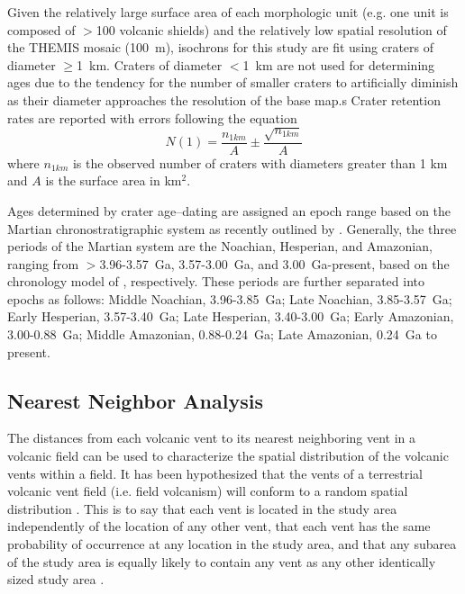 Given the relatively large surface area of each morphologic unit (e.g. one unit is composed of $>$100 volcanic shields) and the relatively low spatial resolution of the THEMIS mosaic (100~m), isochrons for this study are fit using craters of diameter $\ge$1~km. Craters of diameter $<$1~km are not used for determining ages due to the tendency for the number of smaller craters to artificially diminish as their diameter approaches the resolution of the base map.s Crater retention rates are reported with errors following the equation
\begin{equation}
N(1) = \frac{n_{1km}}{A} \pm \frac{\sqrt{n_{1km}}}{A} \label{eq1}
\end{equation} 
where $n_{1km}$ is the observed number of craters with diameters greater than 1 km and $A$ is the surface area in km$^2$.

Ages determined by crater age--dating are assigned an epoch range based on the Martian chronostratigraphic system as recently outlined by \citet{Werner2011}. Generally, the three periods of the Martian system are the Noachian, Hesperian, and Amazonian, ranging from $>$3.96-3.57~Ga, 3.57-3.00~Ga, and 3.00~Ga-present, based on the chronology model of \citet{hartmann2005martian}, respectively. These periods are further separated into epochs as follows: Middle Noachian, 3.96-3.85~Ga; Late Noachian, 3.85-3.57~Ga; Early Hesperian, 3.57-3.40~Ga; Late Hesperian, 3.40-3.00~Ga; Early Amazonian, 3.00-0.88~Ga; Middle Amazonian, 0.88-0.24~Ga; Late Amazonian, 0.24~Ga to present.

\subsection{Nearest Neighbor Analysis}
\label{sec:methodNN}

The distances from each volcanic vent to its nearest neighboring vent in a volcanic field can be used to characterize the spatial distribution of the volcanic vents within a field. It has been hypothesized that the vents of a terrestrial volcanic vent field (i.e. field volcanism) will conform to a random spatial distribution \citep{Lutz1986,lutz1995improved}. This is to say that each vent is located in the study area independently of the location of any other vent, that each vent has the same probability of occurrence at any location in the study area, and that any subarea of the study area is equally likely to contain any vent as any other identically sized study area \citep{Clark1954}.

